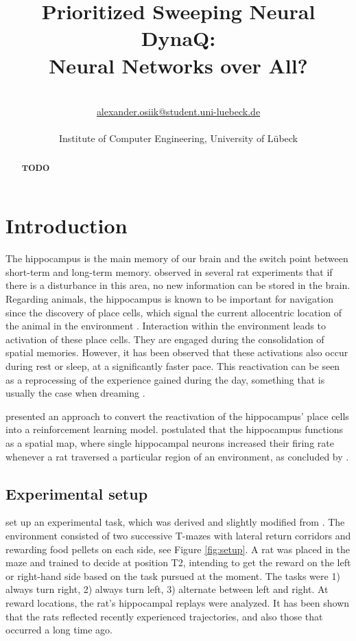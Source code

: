 \documentclass[a4paper]{article}
\title{\textbf{Prioritized Sweeping Neural DynaQ:\\ Neural Networks over All?}}\let\Title\@title
\author{\AuthorName\\
	\href{mailto:alexander.osiik@student.uni-luebeck.de}{alexander.osiik@student.uni-luebeck.de}\\
	\small \seminar\\
	\small Institute of Computer Engineering, University of L\"ubeck\\
}\let\Author\@author
\begin{document}
	\maketitle
	
	\begin{abstract}
		\noindent%
		\textbf{TODO}
	\end{abstract}
	
	
	\section{Introduction}
	\label{sec:introduction}
	\par The hippocampus is the main memory of our brain and the switch point between short-term and long-term memory. \citet{OKEEFE1971171} observed in several rat experiments that if there is a disturbance in this area, no new information can be stored in the brain. Regarding animals, the hippocampus is known to be important for navigation since the discovery of place cells, which signal the current allocentric location of the animal in the environment \citep{Maguire}. Interaction within the environment leads to activation of these place cells. They are engaged during the consolidation of spatial memories. However, it has been observed that these activations also occur during rest or sleep, at a significantly faster pace. This reactivation can be seen as a reprocessing of the experience gained during the day, something that is usually the case when dreaming \citep{HippocampalReplaysGirard}.
	
	\par \citet{NeuralDynaQ} presented an approach to convert the reactivation of the hippocampus' place cells into a reinforcement learning model.  \cite{OKEEFE1971171} postulated that the hippocampus functions as a spatial map, where single hippocampal neurons increased their firing rate whenever a rat traversed a particular region of an environment, as concluded by \cite{Nakazawa}.
	
	\subsection{Experimental setup}
	\par \cite{NeuralDynaQ} set up an experimental task, which was derived and slightly modified from \cite{GUPTA2010695}. The environment consisted of two successive T-mazes with lateral return corridors and rewarding food pellets on each side, see Figure \ref{fig:setup}. A rat was placed in the maze and trained to decide at position T2, intending to get the reward on the left or right-hand side based on the task pursued at the moment. The tasks were 1) always turn right, 2) always turn left, 3) alternate between left and right. At reward locations, the rat's hippocampal replays were analyzed. It has been shown that the rats reflected recently experienced trajectories, and also those that occurred a long time ago.
	
\end{document}
